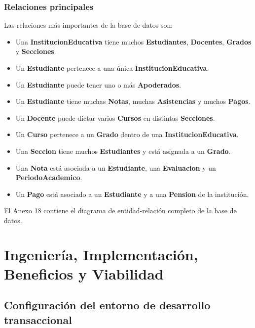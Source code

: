 \documentclass[12pt,a4paper,oneside]{report}
\begin{document}
\subsection{Relaciones principales}
Las relaciones más importantes de la base de datos son:
\begin{itemize}
  \item Una \textbf{InstitucionEducativa} tiene muchos \textbf{Estudiantes}, \textbf{Docentes}, \textbf{Grados} y \textbf{Secciones}.
  \item Un \textbf{Estudiante} pertenece a una única \textbf{InstitucionEducativa}.
  \item Un \textbf{Estudiante} puede tener uno o más \textbf{Apoderados}.
  \item Un \textbf{Estudiante} tiene muchas \textbf{Notas}, muchas \textbf{Asistencias} y muchos \textbf{Pagos}.
  \item Un \textbf{Docente} puede dictar varios \textbf{Cursos} en distintas \textbf{Secciones}.
  \item Un \textbf{Curso} pertenece a un \textbf{Grado} dentro de una \textbf{InstitucionEducativa}.
  \item Una \textbf{Seccion} tiene muchos \textbf{Estudiantes} y está asignada a un \textbf{Grado}.
  \item Una \textbf{Nota} está asociada a un \textbf{Estudiante}, una \textbf{Evaluacion} y un \textbf{PeriodoAcademico}.
  \item Un \textbf{Pago} está asociado a un \textbf{Estudiante} y a una \textbf{Pension} de la institución.
\end{itemize}

El Anexo 18 contiene el diagrama de entidad-relación completo de la base de datos.

\chapter{Ingeniería, Implementación, Beneficios y Viabilidad}

\section{Configuración del entorno de desarrollo transaccional}
\end{document}
